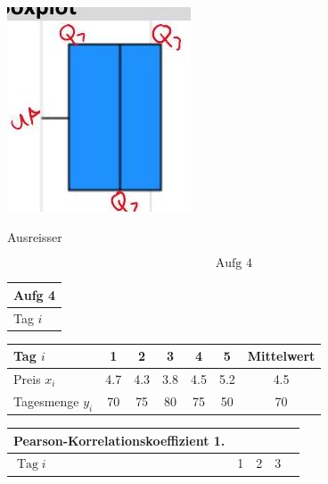\documentclass[10pt]{article}
\begin{document}
{\includegraphics[max width=\textwidth, center]{2024_12_29_0906b02acf849bda8665g-4(6)}

Ausreisser

$$
\text { Aufg } 4
$$

\begin{center}
\begin{tabular}{|l|}
\hline
Aufg 4 \\
\hline
Tag $i$ \\
\hline
\end{tabular}
\end{center}

\begin{center}
\begin{tabular}{|l|c|c|c|c|c|c|}
\hline
Tag $i$ & 1 & 2 & 3 & 4 & 5 & Mittelwert \\
\hline
Preis $x_{i}$ & 4.7 & 4.3 & 3.8 & 4.5 & 5.2 & 4.5 \\
\hline
Tagesmenge $y_{i}$ & 70 & 75 & 80 & 75 & 50 & 70 \\
\hline
\end{tabular}
\end{center}

\begin{center}
\begin{tabular}{|l|l|l|l|l|}
\hline
Pearson-Korrelationskoeffizient 1. &  &  &  \\
\hline
$\operatorname{Tag} i$ & 1 & 2 & 3 \\
\hline
\end{tabular}
\end{center}

}
\end{document}
